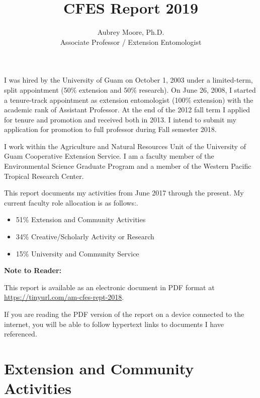\documentclass[12pt,english]{scrartcl}
\begin{document}
\title{CFES Report 2019}

\author{Aubrey Moore, Ph.D.\\
Associate Professor / Extension Entomologist}

\maketitle
I was hired by the University of Guam on October 1, 2003 under a limited-term,
split appointment (50\% extension and 50\% research). On June 26,
2008, I started a tenure-track appointment as extension entomologist
(100\% extension) with the academic rank of Assistant Professor. At
the end of the 2012 fall term I applied for tenure and promotion and
received both in 2013. I intend to submit my application for promotion
to full professor during Fall semester 2018.

I work within the Agriculture and Natural Resources Unit of the University
of Guam Cooperative Extension Service. I am a faculty member of the
Environmental Science Graduate Program and a member of the Western
Pacific Tropical Research Center. 

This report documents my activities from June 2017 through the present.
My current faculty role allocation is as follows:.
\begin{itemize}
\item 51\% Extension and Community Activities 
\item 34\% Creative/Scholarly Activity or Research 
\item 15\% University and Community Service
\end{itemize}
\textbf{Note to Reader:}

This report is available as an electronic document in PDF format at
\url{https://tinyurl.com/am-cfes-rept-2018}. 

If you are reading the PDF version of the report on a device connected
to the internet, you will be able to follow hypertext links to documents
I have referenced. 



\tableofcontents{}

\clearpage

\section{Extension and Community Activities}
\end{document}
